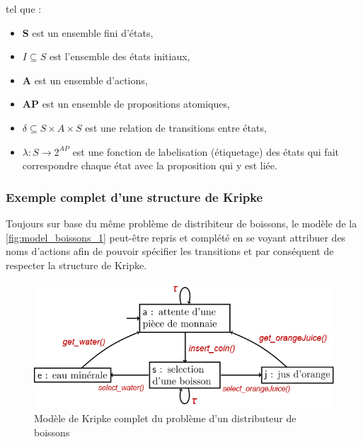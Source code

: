 \documentclass[runningheads,a4paper,10pt]{llncs}
\begin{document}
\noindent
tel que : 
\begin{itemize}
\item \textbf{S} est un ensemble fini d'états, \\
\item \boldmath$I \subseteq S$ est l'ensemble des états initiaux, \\
\item \textbf{A} est un ensemble d'actions, \\
\item \textbf{AP} est un ensemble de propositions atomiques, \\
\item \boldmath$\delta \subseteq S \times A \times S$ est une relation de transitions entre états, \\
\item \boldmath$\lambda : S \rightarrow 2^{AP}$ est une fonction de labelisation (étiquetage) des états qui fait correspondre chaque état avec la proposition qui y est liée.  
\end{itemize}

\subsubsection{Exemple complet d'une structure de Kripke} 

Toujours sur base du même problème de distribiteur de boissons, le modèle de la \autoref{fig:model_boissons_1} peut-être repris et complété en se voyant attribuer des noms d'actions afin de pouvoir spécifier les transitions et par conséquent de respecter la structure de Kripke. 

\begin{figure}
  \centering
   \includegraphics[scale=0.5]{figures/model-boissons-2.png}
   \caption[Caption for LOF]{Modèle de Kripke complet du problème d'un distributeur de boissons}
   \label{fig:model_boissons_2}
\end{figure}
\end{document}
